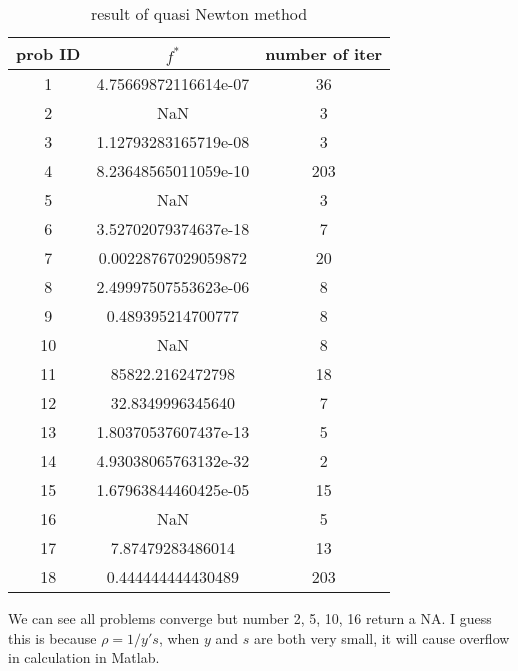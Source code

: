 \documentclass[12pt,a4paper]{article}
\begin{document}
\begin{table}
	\begin{tabular}{|c|c|c|} \hline
		prob ID & $f^*$ & number of iter\\		\hline
	1&	4.75669872116614e-07&	36\\
	2&	NaN	&3\\
	3&	1.12793283165719e-08&	3\\
	4&	8.23648565011059e-10&	203\\
	5&	NaN	&3\\
	6&	3.52702079374637e-18&	7\\
	7&	0.00228767029059872&	20\\
	8&	2.49997507553623e-06&	8\\
	9&	0.489395214700777&	8\\
	10&	NaN&	8\\
	11&	85822.2162472798&	18\\
	12&	32.8349996345640&	7\\
	13&	1.80370537607437e-13&	5\\
	14&	4.93038065763132e-32&	2\\
	15&	1.67963844460425e-05&	15\\
	16&	NaN&	5\\
	17&	7.87479283486014&	13\\
	18&	0.444444444430489&	203\\ \hline
	\end{tabular}
	\caption{result of quasi Newton method}
\end{table}
 We can see all problems converge but number 2, 5, 10, 16 return a NA. I guess this is because $\rho=1/y's$, when $y$ and $s$ are both very small, it will cause overflow in calculation in Matlab.
\end{document}
